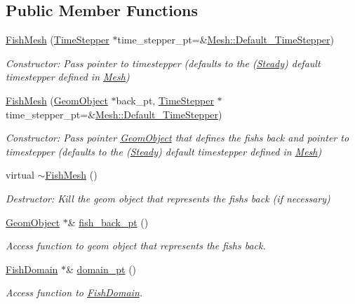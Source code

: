 \subsection*{Public Member Functions}
\begin{DoxyCompactItemize}
\item 
\hyperlink{classoomph_1_1FishMesh_a492c0535a4a0bf97729dfdff3754d211}{Fish\+Mesh} (\hyperlink{classoomph_1_1TimeStepper}{Time\+Stepper} $\ast$time\+\_\+stepper\+\_\+pt=\&\hyperlink{classoomph_1_1Mesh_a12243d0fee2b1fcee729ee5a4777ea10}{Mesh\+::\+Default\+\_\+\+Time\+Stepper})
\begin{DoxyCompactList}\small\item\em Constructor\+: Pass pointer to timestepper (defaults to the (\hyperlink{classoomph_1_1Steady}{Steady}) default timestepper defined in \hyperlink{classoomph_1_1Mesh}{Mesh}) \end{DoxyCompactList}\item 
\hyperlink{classoomph_1_1FishMesh_ac0b931509ec02c03f8ee5676355f196b}{Fish\+Mesh} (\hyperlink{classoomph_1_1GeomObject}{Geom\+Object} $\ast$back\+\_\+pt, \hyperlink{classoomph_1_1TimeStepper}{Time\+Stepper} $\ast$time\+\_\+stepper\+\_\+pt=\&\hyperlink{classoomph_1_1Mesh_a12243d0fee2b1fcee729ee5a4777ea10}{Mesh\+::\+Default\+\_\+\+Time\+Stepper})
\begin{DoxyCompactList}\small\item\em Constructor\+: Pass pointer \hyperlink{classoomph_1_1GeomObject}{Geom\+Object} that defines the fish\textquotesingle{}s back and pointer to timestepper (defaults to the (\hyperlink{classoomph_1_1Steady}{Steady}) default timestepper defined in \hyperlink{classoomph_1_1Mesh}{Mesh}) \end{DoxyCompactList}\item 
virtual \hyperlink{classoomph_1_1FishMesh_a3763b9be54c74d15a8c5b2129e0f4fae}{$\sim$\+Fish\+Mesh} ()
\begin{DoxyCompactList}\small\item\em Destructor\+: Kill the geom object that represents the fish\textquotesingle{}s back (if necessary) \end{DoxyCompactList}\item 
\hyperlink{classoomph_1_1GeomObject}{Geom\+Object} $\ast$\& \hyperlink{classoomph_1_1FishMesh_aa6d659caf657ce5fd549431fadb009d7}{fish\+\_\+back\+\_\+pt} ()
\begin{DoxyCompactList}\small\item\em Access function to geom object that represents the fish\textquotesingle{}s back. \end{DoxyCompactList}\item 
\hyperlink{classoomph_1_1FishDomain}{Fish\+Domain} $\ast$\& \hyperlink{classoomph_1_1FishMesh_ad5076610d83a07e6306375a2632ee460}{domain\+\_\+pt} ()
\begin{DoxyCompactList}\small\item\em Access function to \hyperlink{classoomph_1_1FishDomain}{Fish\+Domain}. \end{DoxyCompactList}\end{DoxyCompactItemize}
